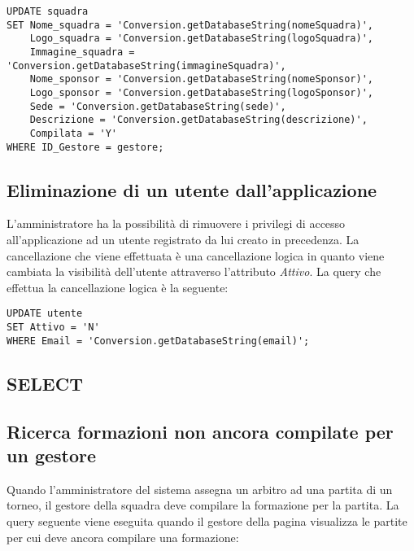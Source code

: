 \begin{lstlisting}
UPDATE squadra
SET Nome_squadra = 'Conversion.getDatabaseString(nomeSquadra)',
    Logo_squadra = 'Conversion.getDatabaseString(logoSquadra)',    
    Immagine_squadra = 'Conversion.getDatabaseString(immagineSquadra)',
    Nome_sponsor = 'Conversion.getDatabaseString(nomeSponsor)',
    Logo_sponsor = 'Conversion.getDatabaseString(logoSponsor)',
    Sede = 'Conversion.getDatabaseString(sede)',
    Descrizione = 'Conversion.getDatabaseString(descrizione)',
    Compilata = 'Y'
WHERE ID_Gestore = gestore;
\end{lstlisting}

\subsection*{Eliminazione di un utente dall'applicazione}
L'amministratore ha la possibilità di rimuovere i privilegi di accesso all'applicazione ad un utente registrato da lui creato in precedenza. La cancellazione che viene effettuata è una cancellazione logica in quanto viene cambiata la visibilità dell'utente attraverso l'attributo \emph{Attivo}.
La query che effettua la cancellazione logica è la seguente:

\begin{lstlisting}
UPDATE utente
SET Attivo = 'N'
WHERE Email = 'Conversion.getDatabaseString(email)';
\end{lstlisting}

\newpage

\subsection{SELECT}

\subsection*{Ricerca formazioni non ancora compilate per un gestore}
Quando l'amministratore del sistema assegna un arbitro ad una partita di un torneo, il gestore della squadra deve compilare la formazione per la partita. La query seguente viene eseguita quando il gestore della pagina visualizza le partite per cui deve ancora compilare una formazione:

